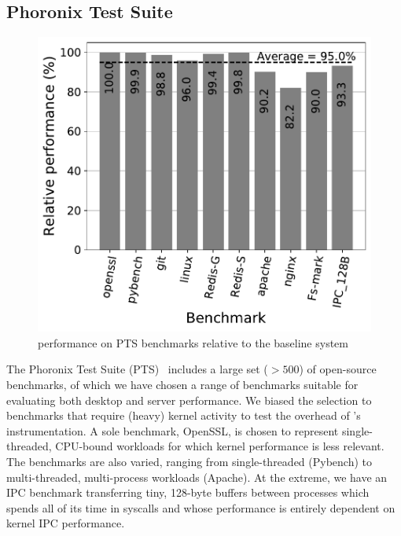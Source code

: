 \documentclass[letterpaper,twocolumn,10pt, anonymous]{article}
\begin{document}
\subsection{Phoronix Test Suite}

\begin{figure}[]
  \includegraphics[width=\linewidth]{img/pts_performance.pdf}
  \caption{\tiktok performance on PTS benchmarks relative to the baseline system}
  \label{fig:pts_performance}
\end{figure}

The Phoronix Test Suite (PTS)~\cite{pts} includes a large set ($>500$) of 
open-source benchmarks, of which we have chosen a range of benchmarks 
suitable for evaluating both desktop and server performance.
We biased the selection to benchmarks that require (heavy) kernel activity to
test the overhead of \tiktok's instrumentation.
A sole benchmark, OpenSSL, is chosen to represent single-threaded, 
CPU-bound workloads for which kernel performance is less relevant.
The benchmarks are also varied, ranging from single-threaded (Pybench) to 
multi-threaded, multi-process workloads (Apache).
At the extreme, we have an IPC benchmark transferring tiny, 128-byte 
buffers between processes which spends all of its time in syscalls
and whose performance is entirely dependent on kernel IPC performance.
\end{document}
